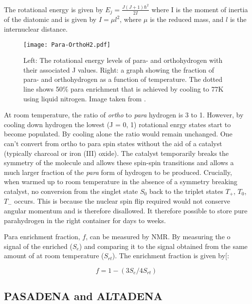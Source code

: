  The rotational energy is given by $E_j = \frac{J(J+1)\hbar^2}{2I}$
 where I is the moment of inertia of the diatomic and is given by $I = \mu l^2$, where $\mu$ is the reduced mass,
 and $l$ is the internuclear distance.

 \begin{figure*}
   \begin{center}
   \texttt{[image: Para-OrthoH2.pdf]}
   \end{center}
   \caption{Left: The rotational energy levels of para- and orthohydrogen with their associated J values. Right: a graph
   showing the fraction of para- and orthohydrogen as a function of temperature. The dotted line shows 50\% para
   enrichment that is achieved by cooling to 77K using liquid nitrogen. Image taken from \citep{barskiy2017nmr}.}
   \label{fig:POH2}
 \end{figure*}


 At room temperature, the ratio of \textit{ortho} to \textit{para} hydrogen is 3 to 1. However, by cooling down hydrogen
 the lowest (J = 0, 1) rotational enrgy states start to become populated. By cooling alone the ratio would remain unchanged.
 One can't convert from ortho to para spin states without the aid of a catalyst (typically charcoal or iron (III) oxide).
 The catalyst temporarily breaks the symmetry of the  molecule and allows these spin-spin transitions and allows
 a much larger fraction of the \textit{para} form of hydrogen to be produced. Crucially, when warmed up to
 room temperature in the absence of a symmetry breaking catalyst, no conversion from the singlet state $S_0$ back to
 the triplet states $T_+$, $T_0$, $T_-$ occurs. This is because the nuclear spin flip required would not
 conserve angular momentum and is therefore disallowed. It therefore possible to store pure parahydrogen
 in the right container for days to weeks.

 Para enrichment fraction, $f$, can be measured by NMR. By measuring the o signal of the enriched  ($S_{e}$)
 and comparing it to the signal obtained from the same amount of  at room temperature ($S_{rt}$).
 The enrichment fraction is given by[\citep{RN131, RN132}:

 \begin{equation}\label{pfrac}
   f = 1 -(3S_{e}/4S_{rt})
 \end{equation}

 \subsection{PASADENA and ALTADENA}\label{PASADENA and ALTADENA}

